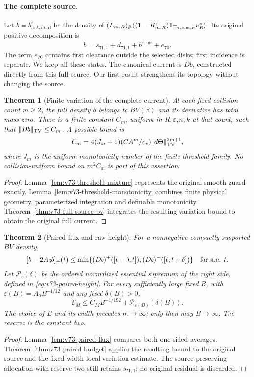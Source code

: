\documentclass[11pt,reqno]{amsart}
\numberwithin{equation}{section}
\newtheorem{revisiontheorem}{Theorem}
\theoremstyle{definition}\newtheorem{definition}[theorem]{Definition}
\theoremstyle{remark}\newtheorem{remark}[theorem]{Remark}
\newcommand{\R}{\mathbb R}\newcommand{\Z}{\mathbb Z}\newcommand{\T}{\mathbb T}
\begin{document}
\paragraph{The complete source.}
Let $b=b^\varepsilon_{n,k,m,R}$ be the density of
$(L_{m,R})_\#((1-H_{m,R}^\varepsilon)\mathbf1_{\Pi_{n,k,m,R}}\nu_R^*)$.
Its original positive decomposition is
\[
 b=s_{71,1}+d_{71,1}+b^{\varepsilon,\mathrm{inc}}+e_{70}.
\]
The term $e_{70}$ contains first clearance outside the selected disks;
first incidence is separate. We keep all these states. The canonical
current is $Db$, constructed directly from this full source. Our first
result strengthens its topology without changing the source.

\begin{revisiontheorem}[Finite variation of the complete current]
\label{thm:intro-v73-bv}
At each fixed collision count $m\ge2$, the full density $b$ belongs to
$BV(\R)$ and its derivative has total mass zero. There is a finite
constant $C_m$, uniform in $R,\varepsilon,n,k$ at that count, such
that $\|Db\|_{\operatorname{TV}}\le C_m$. A possible bound is
\[
 C_m=4(J_m+1)(CA^m/c_*)\|d\Theta\|_{\operatorname{TV}}^{2m+1},
\]
where $J_m$ is the uniform monotonicity number of the finite threshold
family. No collision-uniform bound on $m^2C_m$ is part of this assertion.
\end{revisiontheorem}
\begin{proof}
Lemma~\ref{lem:v73-threshold-mixture} represents the original smooth
guard exactly. Lemma~\ref{lem:v73-threshold-monotonicity} combines
finite physical geometry, parameterized integration and definable
monotonicity. Theorem~\ref{thm:v73-full-source-bv} integrates the
resulting variation bound to obtain the original full current.
\end{proof}

\begin{revisiontheorem}[Paired flux and raw height]
\label{thm:intro-v73-paired}
For a nonnegative compactly supported $BV$ density,
\[
 [b-2A_\delta b]_+(t)
 \le\min\{(Db)^+([t-\delta,t]),(Db)^-([t,t+\delta])\}
 \quad\hbox{for a.e. }t.
\]
Let $\mathcal P_\varepsilon(\delta)$ be the ordered normalized
essential supremum of the right side, defined in
\eqref{eq:v73-paired-height}. For every sufficiently large fixed $B$,
with $\varepsilon(B)=A_0B^{-1/12}$ and any fixed $\delta(B)>0$,
\begin{equation}\label{eq:intro-v73-budget}
 \mathcal E_M\le C_MB^{-1/192}
                  +\mathcal P_{\varepsilon(B)}(\delta(B)).
\end{equation}
The choice of $B$ and its width precedes $m\to\infty$; only then
may $B\to\infty$. The reserve is the constant two.
\end{revisiontheorem}
\begin{proof}
Lemma~\ref{lem:v73-paired-flux} compares both one-sided averages.
Theorem~\ref{thm:v73-paired-budget} applies the resulting bound to
the original source and the fixed-width local-variation estimate.
The source-preserving allocation with reserve two still retains
$s_{71,1}$; no original residual is discarded.
\end{proof}
\end{document}
